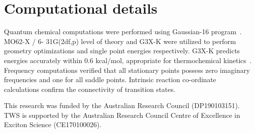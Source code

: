 \documentclass[journal=jacsat,manuscript=article,layout=onecolumn]{achemso}
\begin{document}
\section{Computational details}
Quantum chemical computations were performed using Gaussian-16 program~\cite{g16}. MO62-X / 6- 31G(2df,p) level of theory and G3X-K were utilized to perform geometry optimizations and single point energies respectively. G3X-K predicts energies accurately within 0.6 kcal/mol, appropriate for thermochemical kinetics~\cite{das13}. Frequency computations verified that all stationary points possess zero imaginary frequencies and one for all saddle points. Intrinsic reaction co-ordinate calculations confirm the connectivity of transition states.

\begin{acknowledgement}
This research was funded by the Australian Research Council (DP190103151). TWS is supported by the Australian Research Council Centre of Excellence in Exciton Science (CE170100026).
\end{acknowledgement}




\end{document}
